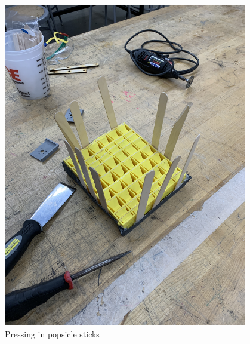 \begin{figure}[ht]
\begin{minipage}[b]{.48\textwidth}
  \includegraphics[width=0.95\textwidth]{Meetings/February/02-13-22/2-12-22_Hardware_Figure2 - Nathan Forrer.JPG}
  \caption{Pressing in popsicle sticks}
  \label{fig:021322_2}
\end{minipage}
\end{figure}

